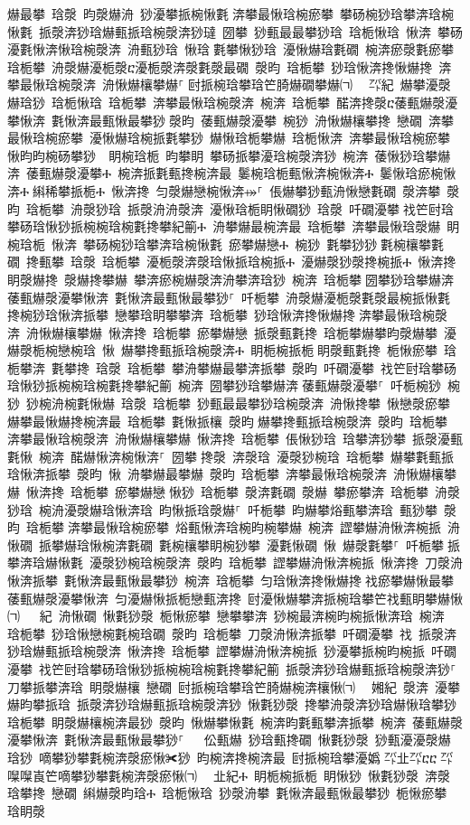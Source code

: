 ﻿\documentclass[output=paper]{langsci/langscibook}
\begin{document}
\begin{exe}
{\begin{exe}
爀最攀 琀漀 昀漀爀洀 猀瀀攀挀椀愀氀਀渀攀最愀琀椀瘀攀 攀砀椀猀琀攀渀琀椀愀氀 挀漀渀猀琀爀甀挀琀椀漀渀猀㼀 圀攀 猀甀最最攀猀琀 琀栀愀琀 愀渀 攀砀瀀氀愀渀愀琀椀漀渀 洀甀猀琀 愀琀਀氀攀愀猀琀 瀀愀爀琀氀礀 椀渀瘀漀氀瘀攀 琀栀攀 洀漀爀瀀栀漀ⴀ瀀栀漀渀漀氀漀最礀 漀昀 琀栀攀 猀琀愀渀搀愀爀搀 渀攀最愀琀椀漀渀 洀愀爀欀攀爀⸀਀尀挀椀琀攀琀笀䐀爀礀攀爀㈀　㄀㌀紀 爀攀瀀漀爀琀猀 琀栀愀琀 琀栀攀 渀攀最愀琀椀漀渀 椀渀 琀栀攀 䤀渀搀漀ⴀ䔀甀爀漀瀀攀愀渀 氀愀渀最甀愀最攀猀਀漀昀 䔀甀爀漀瀀攀 椀猀 洀愀爀欀攀搀 戀礀 渀攀最愀琀椀瘀攀 瀀愀爀琀椀挀氀攀猀 爀愀琀栀攀爀 琀栀愀渀 渀攀最愀琀椀瘀攀 愀昀昀椀砀攀猀਀⠀眀椀琀栀 昀攀眀 攀砀挀攀瀀琀椀漀渀猀 椀渀 䔀愀猀琀攀爀渀 䔀甀爀漀瀀攀Ⰰ 椀渀挀氀甀搀椀渀最 䰀椀琀栀甀愀渀椀愀渀Ⰰ 䰀愀琀瘀椀愀渀Ⰰ਀䌀稀攀挀栀Ⰰ 愀渀搀 匀漀爀戀椀愀渀⤀⸀ 倀爀攀猀甀洀愀戀氀礀 漀渀攀 漀昀 琀栀攀 洀漀猀琀 挀漀洀洀漀渀 瀀愀琀栀眀愀礀猀 琀漀 吀礀瀀攀਀䄀笀尀琀攀砀琀愀猀挀椀椀琀椀氀搀攀紀䈀Ⰰ 洀攀爀最椀渀最 琀栀攀 渀攀最愀琀漀爀 眀椀琀栀 愀渀 攀砀椀猀琀攀渀琀椀愀氀 瘀攀爀戀Ⰰ 椀猀 氀攀猀猀਀氀椀欀攀氀礀 搀甀攀 琀漀 琀栀攀 瀀栀漀渀漀琀愀挀琀椀挀Ⰰ 瀀爀漀猀漀搀椀挀Ⰰ 愀渀搀 眀漀爀搀 漀爀搀攀爀 攀渀瘀椀爀漀渀洀攀渀琀猀 椀渀 琀栀攀਀圀攀猀琀攀爀渀 䔀甀爀漀瀀攀愀渀 氀愀渀最甀愀最攀猀⸀ 吀栀攀 洀漀爀瀀栀漀氀漀最椀挀愀氀 搀椀猀琀愀渀挀攀 戀攀琀眀攀攀渀 琀栀攀 猀琀愀渀搀愀爀搀਀渀攀最愀琀椀漀渀 洀愀爀欀攀爀 愀渀搀 琀栀攀 瘀攀爀戀 挀漀甀氀搀 琀栀攀爀攀昀漀爀攀 瀀爀漀栀椀戀椀琀 愀 爀攀搀甀挀琀椀漀渀Ⰰ 眀栀椀挀栀਀眀漀甀氀搀 栀愀瘀攀 琀栀攀渀 氀攀搀 琀漀 琀栀攀 攀洀攀爀最攀渀挀攀 漀昀 吀礀瀀攀 䄀笀尀琀攀砀琀愀猀挀椀椀琀椀氀搀攀紀䈀 椀渀 圀攀猀琀攀爀渀਀䔀甀爀漀瀀攀⸀ 吀栀椀猀 椀猀 猀椀洀椀氀愀爀 琀漀 琀栀攀 猀甀最最攀猀琀椀漀渀 洀愀搀攀 愀戀漀瘀攀 爀攀最愀爀搀椀渀最 琀栀攀 氀愀挀欀 漀昀਀爀攀搀甀挀琀椀漀渀 漀昀 琀栀攀 渀攀最愀琀椀漀渀 洀愀爀欀攀爀 愀渀搀 琀栀攀 倀愀猀琀 琀攀渀猀攀 挀漀瀀甀氀愀 椀渀 䤀爀愀渀椀愀渀⸀ 圀攀਀搀漀 渀漀琀 瀀漀猀椀琀 琀栀攀 爀攀氀甀挀琀愀渀挀攀 漀昀 愀 洀攀爀最攀爀 漀昀 琀栀攀 渀攀最愀琀椀漀渀 洀愀爀欀攀爀 愀渀搀 琀栀攀 瘀攀爀戀਀愀猀 琀栀攀 漀渀氀礀 漀爀 攀瘀攀渀 琀栀攀 洀漀猀琀 椀洀瀀漀爀琀愀渀琀 昀愀挀琀漀爀⸀ 吀栀攀 昀爀攀焀甀攀渀琀 甀猀攀 漀昀 琀栀攀਀渀攀最愀琀椀瘀攀 焀甀愀渀琀椀昀椀攀爀 椀渀 䜀攀爀洀愀渀椀挀 洀愀礀 挀攀爀琀愀椀渀氀礀 氀椀欀攀眀椀猀攀 瀀氀愀礀 愀 爀漀氀攀⸀ 吀栀攀਀挀攀渀琀爀愀氀 瀀漀猀椀琀椀漀渀 漀昀 琀栀攀 䜀攀爀洀愀渀椀挀 愀渀搀 刀漀洀愀渀挀攀 氀愀渀最甀愀最攀猀 椀渀 琀栀攀 匀琀愀渀搀愀爀搀਀䄀瘀攀爀愀最攀 䔀甀爀漀瀀攀愀渀 匀瀀爀愀挀栀戀甀渀搀 尀瀀愀爀攀渀挀椀琀攀笀䄀甀眀攀爀愀㈀　㄀㄀紀 洀愀礀 愀氀猀漀 栀愀瘀攀 戀攀攀渀 猀椀最渀椀昀椀挀愀渀琀 椀渀 琀栀攀 猀琀愀戀椀氀椀琀礀 漀昀 琀栀攀 刀漀洀愀渀挀攀 吀礀瀀攀 䄀 挀漀渀猀琀爀甀挀琀椀漀渀 愀渀搀 琀栀攀 䜀攀爀洀愀渀椀挀 猀瀀攀挀椀昀椀挀 吀礀瀀攀 䄀笀尀琀攀砀琀愀猀挀椀椀琀椀氀搀攀紀䈀 挀漀渀猀琀爀甀挀琀椀漀渀猀⸀ 刀攀挀攀渀琀 眀漀爀欀 戀礀 尀挀椀琀攀琀笀䐀爀椀渀欀愀㈀　㄀㜀紀 漀渀 瀀攀爀昀攀挀琀 挀漀渀猀琀爀甀挀琀椀漀渀猀 愀氀猀漀 搀攀洀漀渀猀琀爀愀琀攀猀 琀栀攀 眀漀爀欀椀渀最猀 漀昀 愀爀攀愀氀 椀渀昀氀甀攀渀挀攀 椀渀 䔀甀爀漀瀀攀愀渀 氀愀渀最甀愀最攀猀⸀  ਀਀伀甀爀 猀琀甀搀礀 愀氀猀漀 猀甀瀀瀀漀爀琀猀 嘀攀猀攀氀椀渀漀瘀愀✀猀 昀椀渀搀椀渀最 尀挀椀琀攀瀀嬀㄀㌀㐀㌀ⴀⴀ㄀㌀㘀㘀崀笀嘀攀猀攀氀椀渀漀瘀愀㈀　㄀㐀紀Ⰰ 眀栀椀挀栀 眀愀猀 愀氀猀漀 渀漀琀攀搀 戀礀 䌀爀漀昀琀Ⰰ 琀栀愀琀 猀漀洀攀 氀愀渀最甀愀最攀猀 栀愀瘀攀 琀眀漀
\end{exe}}
\end{exe}
\end{document}
